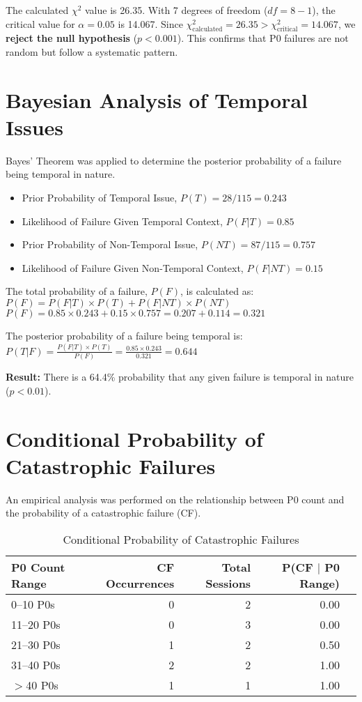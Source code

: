 \documentclass[12pt]{article}
\begin{document}
The calculated $\chi^2$ value is 26.35. With 7 degrees of freedom ($df = 8-1$), the critical value for $\alpha = 0.05$ is 14.067.
Since $\chi^2_{\text{calculated}} = 26.35 > \chi^2_{\text{critical}} = 14.067$, we \textbf{reject the null hypothesis} ($p < 0.001$). This confirms that P0 failures are not random but follow a systematic pattern.

\section{Bayesian Analysis of Temporal Issues}
Bayes' Theorem was applied to determine the posterior probability of a failure being temporal in nature.

\begin{itemize}
    \item Prior Probability of Temporal Issue, $P(T) = 28/115 = 0.243$
    \item Likelihood of Failure Given Temporal Context, $P(F|T) = 0.85$
    \item Prior Probability of Non-Temporal Issue, $P(NT) = 87/115 = 0.757$
    \item Likelihood of Failure Given Non-Temporal Context, $P(F|NT) = 0.15$
\end{itemize}

The total probability of a failure, $P(F)$, is calculated as:
$P(F) = P(F|T) \times P(T) + P(F|NT) \times P(NT)$
$P(F) = 0.85 \times 0.243 + 0.15 \times 0.757 = 0.207 + 0.114 = 0.321$

The posterior probability of a failure being temporal is:
$P(T|F) = \frac{P(F|T) \times P(T)}{P(F)} = \frac{0.85 \times 0.243}{0.321} = 0.644$

\textbf{Result:} There is a 64.4\% probability that any given failure is temporal in nature ($p < 0.01$).

\section{Conditional Probability of Catastrophic Failures}
An empirical analysis was performed on the relationship between P0 count and the probability of a catastrophic failure (CF).

\begin{table}[h!]
    \centering
    \begin{tabular}{lrrrr}
    \toprule
    \textbf{P0 Count Range} & \textbf{CF Occurrences} & \textbf{Total Sessions} & \textbf{P(CF $|$ P0 Range)} \\
    \midrule
    0--10 P0s & 0 & 2 & 0.00 \\
    11--20 P0s & 0 & 3 & 0.00 \\
    21--30 P0s & 1 & 2 & 0.50 \\
    31--40 P0s & 2 & 2 & 1.00 \\
    $>$40 P0s & 1 & 1 & 1.00 \\
    \bottomrule
    \end{tabular}
    \caption{Conditional Probability of Catastrophic Failures}
    \label{tab:cf-probability}
\end{table}
\end{document}
